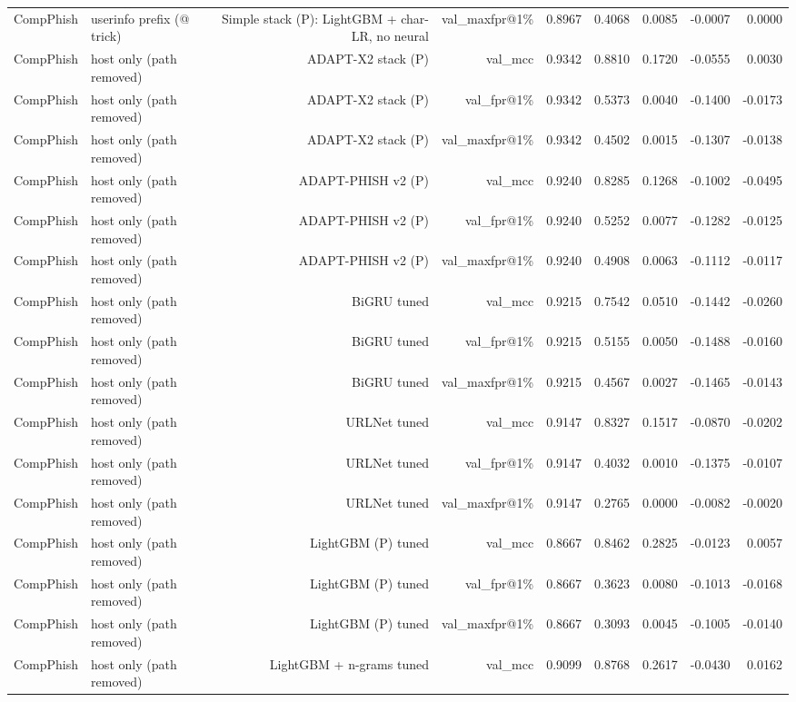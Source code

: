 \begin{table}[t]
\begin{tabular}{llrrrrrrr}
CompPhish & userinfo prefix (@ trick) & Simple stack (P): LightGBM + char-LR, no neural & val\_maxfpr@1\% & 0.8967 & 0.4068 & 0.0085 & -0.0007 & 0.0000 \\
CompPhish & host only (path removed) & ADAPT-X2 stack (P) & val\_mcc & 0.9342 & 0.8810 & 0.1720 & -0.0555 & 0.0030 \\
CompPhish & host only (path removed) & ADAPT-X2 stack (P) & val\_fpr@1\% & 0.9342 & 0.5373 & 0.0040 & -0.1400 & -0.0173 \\
CompPhish & host only (path removed) & ADAPT-X2 stack (P) & val\_maxfpr@1\% & 0.9342 & 0.4502 & 0.0015 & -0.1307 & -0.0138 \\
CompPhish & host only (path removed) & ADAPT-PHISH v2 (P) & val\_mcc & 0.9240 & 0.8285 & 0.1268 & -0.1002 & -0.0495 \\
CompPhish & host only (path removed) & ADAPT-PHISH v2 (P) & val\_fpr@1\% & 0.9240 & 0.5252 & 0.0077 & -0.1282 & -0.0125 \\
CompPhish & host only (path removed) & ADAPT-PHISH v2 (P) & val\_maxfpr@1\% & 0.9240 & 0.4908 & 0.0063 & -0.1112 & -0.0117 \\
CompPhish & host only (path removed) & BiGRU tuned & val\_mcc & 0.9215 & 0.7542 & 0.0510 & -0.1442 & -0.0260 \\
CompPhish & host only (path removed) & BiGRU tuned & val\_fpr@1\% & 0.9215 & 0.5155 & 0.0050 & -0.1488 & -0.0160 \\
CompPhish & host only (path removed) & BiGRU tuned & val\_maxfpr@1\% & 0.9215 & 0.4567 & 0.0027 & -0.1465 & -0.0143 \\
CompPhish & host only (path removed) & URLNet tuned & val\_mcc & 0.9147 & 0.8327 & 0.1517 & -0.0870 & -0.0202 \\
CompPhish & host only (path removed) & URLNet tuned & val\_fpr@1\% & 0.9147 & 0.4032 & 0.0010 & -0.1375 & -0.0107 \\
CompPhish & host only (path removed) & URLNet tuned & val\_maxfpr@1\% & 0.9147 & 0.2765 & 0.0000 & -0.0082 & -0.0020 \\
CompPhish & host only (path removed) & LightGBM (P) tuned & val\_mcc & 0.8667 & 0.8462 & 0.2825 & -0.0123 & 0.0057 \\
CompPhish & host only (path removed) & LightGBM (P) tuned & val\_fpr@1\% & 0.8667 & 0.3623 & 0.0080 & -0.1013 & -0.0168 \\
CompPhish & host only (path removed) & LightGBM (P) tuned & val\_maxfpr@1\% & 0.8667 & 0.3093 & 0.0045 & -0.1005 & -0.0140 \\
CompPhish & host only (path removed) & LightGBM + n-grams tuned & val\_mcc & 0.9099 & 0.8768 & 0.2617 & -0.0430 & 0.0162 \\

\end{tabular}
\end{table}
